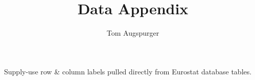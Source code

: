 \documentclass[11pt]{article}
\title{Data Appendix}
\author{Tom Augspurger}
\date{}
\begin{document}
\maketitle

Supply-use row & column labels pulled directly from Eurostat database tables.
\end{document}
